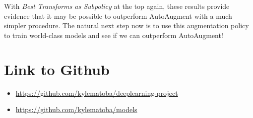 \documentclass[10pt,twocolumn,letterpaper]{article}
\begin{document}
		With \textit{Best Transforms as Subpolicy} at the top again, these results provide evidence that it may be possible to outperform AutoAugment with a much simpler procedure. The natural next step now is to use this augmentation policy to train world-class models and see if we can outperform AutoAugment!
		

	
\section{Link to Github}

	\begin{itemize}
	\item \url{https://github.com/kylematoba/deeplearning-project}
	\item \url{https://github.com/kylematoba/models}
	\end{itemize}


\nocite{Torralba2008}
{\small


}
\end{document}
